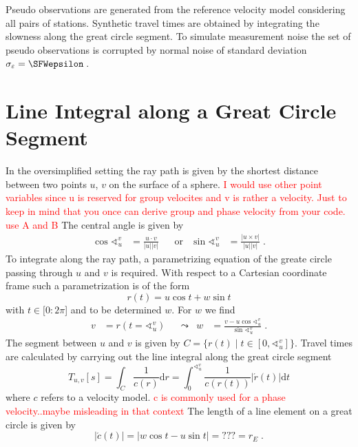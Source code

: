 \documentclass[11pt]{article}
\newcommand\worries[1]{\textcolor{red}{#1}}
\begin{document}
Pseudo observations are generated from the reference velocity model considering all pairs of stations.
Synthetic travel times are obtained by integrating the slowness along the great circle segment.
To simulate measurement noise the set of pseudo observations is corrupted by normal noise of standard deviation $\sigma_\varepsilon = \SFWepsilon$\,.


\section{Line Integral along a Great Circle Segment}
In the oversimplified setting the ray path is given by the shortest distance between two points $u$, $v$ on the surface of a sphere.
\worries{I would use other point variables since u is reserved for group velocites and v is rather a velocity. Just to keep in mind that you once can derive group and phase velocity from your code. use A and B}
The central angle is given by
\begin{align}
    \cos \sphericalangle_u^v &= \frac{u \cdot v}{|u||v|} &
    &\text{or}&
    \sin \sphericalangle_u^v &= \frac{|u \times v|}{|u||v|}
    \; .
\end{align}
To integrate along the ray path, a parametrizing equation of the greate circle passing through $u$ and $v$ is required.
With respect to a Cartesian coordinate frame such a parametrization is of the form
\begin{equation}
    r(t) = u \cos t + w \sin t
\end{equation}
with $t \in [0:2\pi$] and to be determined $w$.
For $w$ we find
\begin{align}
    v &= r(t = \sphericalangle_u^v) &
    &\leadsto &
    w &= \frac{v - u \cos \sphericalangle_u^v}{\sin \sphericalangle_u^v}
    \; .
\end{align}
The segment between $u$ and $v$ is given by $C= \{r(t) \mid t \in [0, \sphericalangle_u^v]\}$.
Travel times are calculated by carrying out the line integral along the great circle segment
\begin{equation}
    T_{u,v}[s]
    = \int_C \frac1{c(r)} \mathrm d r
    = \int_0^{\sphericalangle_u^v} \frac 1{c(r(t))} |\acute r(t)| \mathrm d t
\end{equation}
where $c$ refers to a velocity model.
\worries{c is commonly used for a phase velocity..maybe misleading in that context}
The length of a line element on a great circle is given by
\begin{equation}
    |\acute c(t)| = |w \cos t - u \sin t| = ??? = r_E
    \; .
\end{equation}
\end{document}
